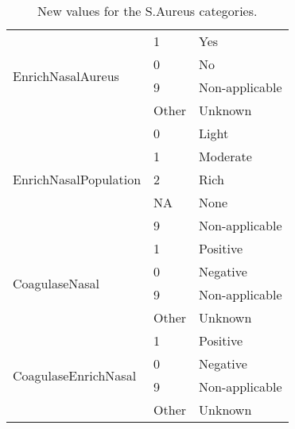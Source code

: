 \begin{table}[H]
\begin{tabular}{l | l | l}
            \multirow{4}{*}{EnrichNasalAureus} & \multicolumn{1}{l}{1}     & \multicolumn{1}{l}{Yes}            \\\cline{2-3}
                                               & \multicolumn{1}{l}{0}     & \multicolumn{1}{l}{No}             \\\cline{2-3}
                                               & \multicolumn{1}{l}{9}     & \multicolumn{1}{l}{Non-applicable} \\\cline{2-3}
                                               & \multicolumn{1}{l}{Other} & \multicolumn{1}{l}{Unknown}        \\\hline

            \multirow{5}{*}{EnrichNasalPopulation} & \multicolumn{1}{l}{0}  & \multicolumn{1}{l}{Light}          \\\cline{2-3}
                                                   & \multicolumn{1}{l}{1}  & \multicolumn{1}{l}{Moderate}       \\\cline{2-3}
                                                   & \multicolumn{1}{l}{2}  & \multicolumn{1}{l}{Rich}           \\\cline{2-3}
					                               & \multicolumn{1}{l}{NA} & \multicolumn{1}{l}{None}           \\\cline{2-3}
                                                   & \multicolumn{1}{l}{9}  & \multicolumn{1}{l}{Non-applicable} \\\hline

            \multirow{4}{*}{CoagulaseNasal} & \multicolumn{1}{l}{1}     & \multicolumn{1}{l}{Positive}       \\\cline{2-3}
                                            & \multicolumn{1}{l}{0}     & \multicolumn{1}{l}{Negative}       \\\cline{2-3}
                                            & \multicolumn{1}{l}{9}     & \multicolumn{1}{l}{Non-applicable} \\\cline{2-3}
                                            & \multicolumn{1}{l}{Other} & \multicolumn{1}{l}{Unknown}        \\\hline

            \multirow{4}{*}{CoagulaseEnrichNasal} & \multicolumn{1}{l}{1}     & \multicolumn{1}{l}{Positive}       \\\cline{2-3}
                                                  & \multicolumn{1}{l}{0}     & \multicolumn{1}{l}{Negative}       \\\cline{2-3}
                                                  & \multicolumn{1}{l}{9}     & \multicolumn{1}{l}{Non-applicable} \\\cline{2-3}
                                                  & \multicolumn{1}{l}{Other} & \multicolumn{1}{l}{Unknown}        \\\hline

        \end{tabular}

    \caption{New values for the S.Aureus categories.}

\end{table}

